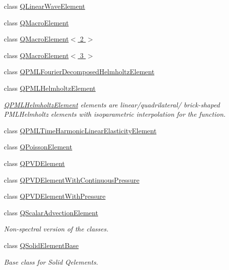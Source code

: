 \begin{DoxyCompactItemize}
\item 
class \hyperlink{classoomph_1_1QLinearWaveElement}{Q\+Linear\+Wave\+Element}
\item 
class \hyperlink{classoomph_1_1QMacroElement}{Q\+Macro\+Element}
\item 
class \hyperlink{classoomph_1_1QMacroElement_3_012_01_4}{Q\+Macro\+Element$<$ 2 $>$}
\item 
class \hyperlink{classoomph_1_1QMacroElement_3_013_01_4}{Q\+Macro\+Element$<$ 3 $>$}
\item 
class \hyperlink{classoomph_1_1QPMLFourierDecomposedHelmholtzElement}{Q\+P\+M\+L\+Fourier\+Decomposed\+Helmholtz\+Element}
\item 
class \hyperlink{classoomph_1_1QPMLHelmholtzElement}{Q\+P\+M\+L\+Helmholtz\+Element}
\begin{DoxyCompactList}\small\item\em \hyperlink{classoomph_1_1QPMLHelmholtzElement}{Q\+P\+M\+L\+Helmholtz\+Element} elements are linear/quadrilateral/ brick-\/shaped P\+M\+L\+Helmholtz elements with isoparametric interpolation for the function. \end{DoxyCompactList}\item 
class \hyperlink{classoomph_1_1QPMLTimeHarmonicLinearElasticityElement}{Q\+P\+M\+L\+Time\+Harmonic\+Linear\+Elasticity\+Element}
\item 
class \hyperlink{classoomph_1_1QPoissonElement}{Q\+Poisson\+Element}
\item 
class \hyperlink{classoomph_1_1QPVDElement}{Q\+P\+V\+D\+Element}
\item 
class \hyperlink{classoomph_1_1QPVDElementWithContinuousPressure}{Q\+P\+V\+D\+Element\+With\+Continuous\+Pressure}
\item 
class \hyperlink{classoomph_1_1QPVDElementWithPressure}{Q\+P\+V\+D\+Element\+With\+Pressure}
\item 
class \hyperlink{classoomph_1_1QScalarAdvectionElement}{Q\+Scalar\+Advection\+Element}
\begin{DoxyCompactList}\small\item\em Non-\/spectral version of the classes. \end{DoxyCompactList}\item 
class \hyperlink{classoomph_1_1QSolidElementBase}{Q\+Solid\+Element\+Base}
\begin{DoxyCompactList}\small\item\em Base class for Solid Qelements. \end{DoxyCompactList}\item 

\end{DoxyCompactItemize}
